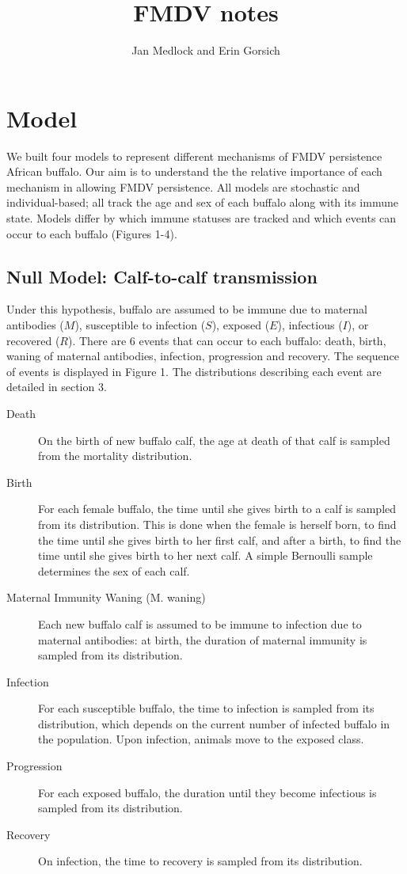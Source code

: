 \documentclass{article}
\title{FMDV notes}
\author{Jan Medlock and Erin Gorsich}
\begin{document}
\maketitle

\section{Model}

We built four models to represent different mechanisms of FMDV persistence African buffalo.  
Our aim is to understand the the relative importance of each mechanism in allowing FMDV persistence. 
All models are stochastic and individual-based; all track the age and sex of each buffalo along with its immune state.
Models differ by which immune statuses are tracked and which events can occur to each buffalo (Figures 1-4).  

\subsection{Null Model: Calf-to-calf transmission}
Under this hypothesis, buffalo are assumed to be immune due to maternal antibodies ($M$), susceptible to infection ($S$), exposed ($E$), infectious ($I$), or recovered ($R$).  
There are 6 events that can occur to each buffalo: death, birth, waning of maternal antibodies, infection, progression and recovery.
The sequence of events is displayed in Figure 1. The distributions describing each event are detailed in section 3.

\begin{description}
\item[Death] On the birth of new buffalo calf, the age at death of that calf is sampled from the mortality distribution.

\item[Birth] For each female buffalo, the time until she gives birth to a calf is sampled from its distribution.  
This is done when the female is herself born, to find the time until she gives birth to her first calf, and after a birth, to find the time until she gives birth to her next calf.  
A simple Bernoulli sample determines the sex of each calf.

\item[Maternal Immunity Waning (M. waning)] Each new buffalo calf is assumed to be immune to infection due to maternal antibodies: at birth, the duration of maternal immunity is sampled from its distribution.

\item[Infection] For each susceptible buffalo, the time to infection is sampled from its distribution, which depends on the current number of infected buffalo in the population. 
Upon infection, animals move to the exposed class.

\item[Progression] For each exposed buffalo, the duration until they become infectious is sampled from its distribution.  

\item[Recovery] On infection, the time to recovery is sampled from its distribution.
\end{description}
\end{document}
